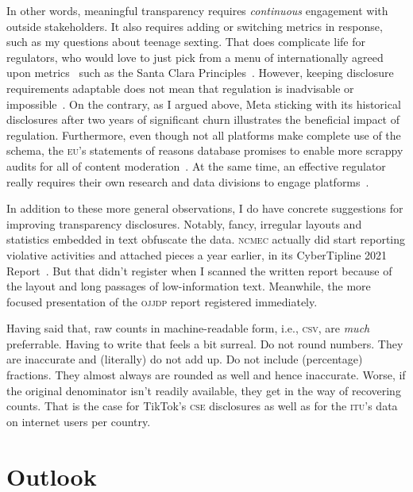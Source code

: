 \documentclass[nonacm,screen]{acmart}
\newcommand\V[1]{\textsc{\MakeLowercase{#1}}}
\begin{document}
In other words, meaningful transparency requires \emph{continuous} engagement
with outside stakeholders. It also requires adding or switching metrics in
response, such as my questions about teenage sexting. That does complicate life
for regulators, who would love to just pick from a menu of internationally
agreed upon metrics~\cite{HarlingHenesyea2023} such as the Santa Clara
Principles~\cite{AccessNowACLUFoundationOfNorthernCaliforniaea2021}. However,
keeping disclosure requirements adaptable does not mean that regulation is
inadvisable or impossible~\cite{Douek2022,Klonick2023}. On the contrary, as I
argued above, Meta sticking with its historical disclosures after two years of
significant churn illustrates the beneficial impact of regulation. Furthermore,
even though not all platforms make complete use of the schema, the \V{EU}'s
statements of reasons database promises to enable more scrappy audits for all of
content moderation~\cite{TrujilloFagniea2024}. At the same time, an effective
regulator really requires their own research and data divisions to engage
platforms~\cite{Jaursch2022a,Jaursch2023}.

In addition to these more general observations, I do have concrete suggestions
for improving transparency disclosures. Notably, fancy, irregular layouts and
statistics embedded in text obfuscate the data. \V{NCMEC} actually did start
reporting violative activities and attached pieces a year earlier, in its
CyberTipline 2021 Report~\cite{NcmecCyberTipline2021}. But that didn't register
when I scanned the written report because of the layout and long passages of
low-information text. Meanwhile, the more focused presentation of the \V{OJJDP}
report registered immediately.

Having said that, raw counts in machine-readable form, i.e., \V{CSV}, are
\emph{much} preferrable. Having to write that feels a bit surreal. Do not round
numbers. They are inaccurate and (literally) do not add up. Do not include
(percentage) fractions. They almost always are rounded as well and hence
inaccurate. Worse, if the original denominator isn't readily available, they get
in the way of recovering counts. That is the case for TikTok's \V{CSE}
disclosures as well as for the \V{ITU}'s data on internet users per country.


\section{Outlook}
\label{sec:outlook}
\end{document}
